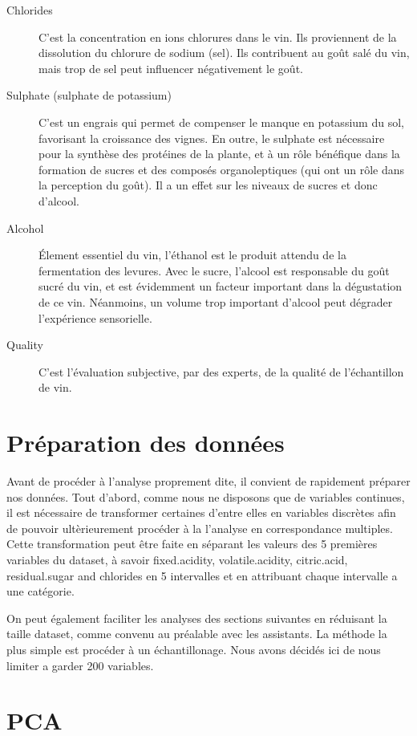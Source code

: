\documentclass[11pt,a4paper]{article}
\begin{document}
\begin{description}
	\item[Chlorides] C'est la concentration en ions chlorures dans le vin. Ils proviennent de la dissolution du chlorure de sodium (sel). Ils contribuent au goût salé du vin, mais trop de sel peut influencer négativement le goût.
	\item[Sulphate (sulphate de potassium)] C'est un engrais qui permet de compenser le manque en potassium du sol, favorisant la croissance des vignes. En outre, le sulphate est nécessaire pour la synthèse des protéines de la plante, et à un rôle bénéfique dans la formation de sucres et des composés organoleptiques (qui ont un rôle dans la perception du goût). Il a un effet sur les niveaux de sucres et donc d'alcool.
	\item[Alcohol] \'Element essentiel du vin, l'éthanol est le produit attendu de la fermentation des levures. Avec le sucre, l'alcool est responsable du goût sucré du vin, et est évidemment un facteur important dans la dégustation de ce vin. Néanmoins, un volume trop important d'alcool peut dégrader l'expérience sensorielle.
	\item[Quality] C'est l'évaluation subjective, par des experts, de la qualité de l'échantillon de vin.
\end{description}

\section{Préparation des données}

Avant de procéder à l'analyse proprement dite, il convient de rapidement préparer nos données. Tout d'abord, comme nous ne disposons que de variables continues, il est nécessaire de transformer certaines d'entre elles en variables discrètes afin de pouvoir ultèrieurement procéder à la l'analyse en correspondance multiples. Cette transformation peut être faite en séparant les valeurs des 5 premières variables du dataset, à savoir fixed.acidity, volatile.acidity, citric.acid, residual.sugar and chlorides en 5 intervalles et en attribuant chaque intervalle a une catégorie. 

On peut également faciliter les analyses des sections suivantes en réduisant la taille dataset, comme convenu au préalable avec les assistants. La méthode la plus simple est procéder à un échantillonage. Nous avons décidés ici de nous limiter a garder 200 variables.

\section{PCA}
\end{document}
